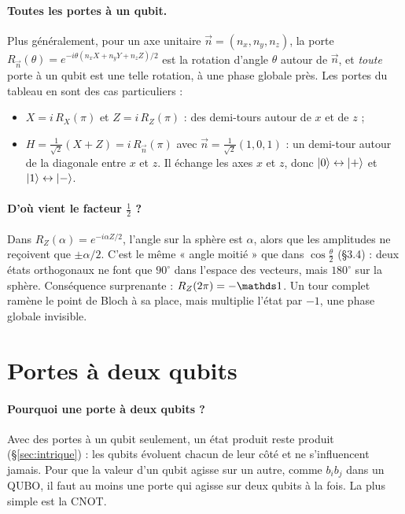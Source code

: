 \paragraph{Toutes les portes à un qubit.} Plus généralement, pour un axe unitaire $\vec n=(n_x,n_y,n_z)$, la porte $R_{\vec n}(\theta)=e^{-i\theta(n_xX+n_yY+n_zZ)/2}$ est la rotation d'angle $\theta$ autour de $\vec n$, et \emph{toute} porte à un qubit est une telle rotation, à une phase globale près. Les portes du tableau en sont des cas particuliers :
\begin{itemize}
\item $X=i\,R_X(\pi)$ et $Z=i\,R_Z(\pi)$ : des demi-tours autour de $x$ et de $z$ ;
\item $H=\tfrac1{\sqrt2}(X+Z)=i\,R_{\vec n}(\pi)$ avec $\vec n=\tfrac1{\sqrt2}(1,0,1)$ : un demi-tour autour de la diagonale entre $x$ et $z$. Il échange les axes $x$ et $z$, donc $\lvert 0\rangle\leftrightarrow\lvert +\rangle$ et $\lvert 1\rangle\leftrightarrow\lvert -\rangle$.
\end{itemize}

\paragraph{D'où vient le facteur $\tfrac12$ ?} Dans $R_Z(\alpha)=e^{-i\alpha Z/2}$, l'angle sur la sphère est $\alpha$, alors que les amplitudes ne reçoivent que $\pm\alpha/2$. C'est le même « angle moitié » que dans $\cos\tfrac\theta2$ (§3.4) : deux états orthogonaux ne font que $90^\circ$ dans l'espace des vecteurs, mais $180^\circ$ sur la sphère. Conséquence surprenante : $R_Z(2\pi)=-\Id$. Un tour complet ramène le point de Bloch à sa place, mais multiplie l'état par $-1$, une phase globale invisible.

\section{Portes à deux qubits}
\paragraph{Pourquoi une porte à deux qubits ?} Avec des portes à un qubit seulement, un état produit reste produit (§\ref{sec:intrique}) : les qubits évoluent chacun de leur côté et ne s'influencent jamais. Pour que la valeur d'un qubit agisse sur un autre, comme $b_ib_j$ dans un QUBO, il faut au moins une porte qui agisse sur deux qubits à la fois. La plus simple est la CNOT.

